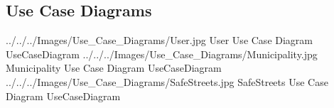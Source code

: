 \documentclass[../../../rasd.tex]{subfiles}
\begin{document}
\subsection{Use Case Diagrams\label{sect:3.2.2}}

\image {13cm} {../../../Images/Use_Case_Diagrams/User.jpg} {User Use Case Diagram} {UseCaseDiagram}
\image {13cm} {../../../Images/Use_Case_Diagrams/Municipality.jpg} {Municipality Use Case Diagram} {UseCaseDiagram}
\image {13cm} {../../../Images/Use_Case_Diagrams/SafeStreets.jpg} {SafeStreets Use Case Diagram} {UseCaseDiagram}
\end{document}
